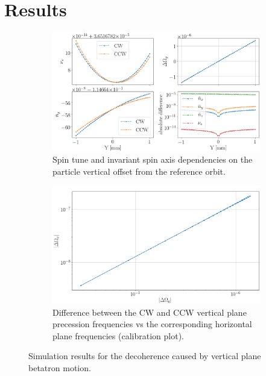 \documentclass[a4paper]{jacow}
\begin{document}
\section{Results}

\begin{figure}[h]
  \centering
  \begin{subfigure}{\linewidth}\centering
    \includegraphics[width=\linewidth]{../img/IPAC19/GFF_stune_range_Y}
    \caption{Spin tune and invariant spin axis dependencies on the particle vertical offset
      from the reference orbit.\label{fig:Y:calib_plot:stune}}
  \end{subfigure}
  \begin{subfigure}{\linewidth}\centering
    \includegraphics[width=\linewidth]{../img/IPAC19/GFF_omegas_range_Y}
    \caption{Difference between the CW and CCW vertical plane precession frequencies
      vs the corresponding horizontal plane frequencies (calibration plot).\label{fig:Y:calib_plot:omegas}}
  \end{subfigure}
  \caption{Simulation results for the decoherence caused by
    vertical plane betatron motion.\label{fig:Y:calib_plot}}
\end{figure}
\end{document}
